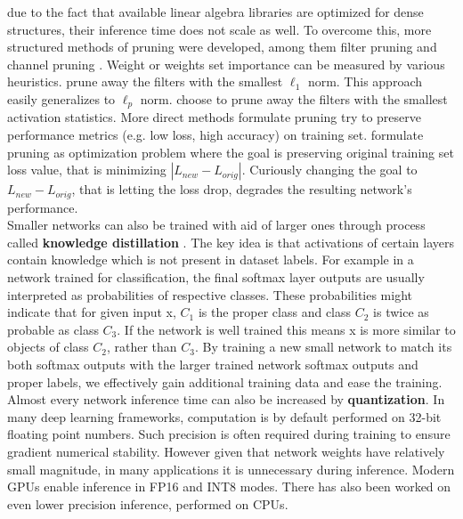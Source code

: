 \documentclass[../Main.tex]{subfiles}
\begin{document}
    due to the fact that available linear algebra libraries are optimized for dense structures,
    their inference time does not scale as well. To overcome this, more structured
    methods of pruning were developed, among them filter pruning \cite{li2016pruning, molchanov2016pruning}
    and channel pruning \cite{he2017channel}. 
    Weight or weights set importance can be measured by various heuristics. 
    \cite{li2016pruning} prune away the filters with the smallest $\ell_1$ norm.
    This approach easily generalizes to $\ell_p$ norm.
    \cite{polyak2015} choose to prune away the filters with
    the smallest activation statistics. More direct methods formulate pruning 
    try to preserve performance metrics (e.g. low loss, high accuracy) on training set. 
    \cite{molchanov2016pruning} formulate pruning as optimization problem where
    the goal is preserving original training set loss value, that is minimizing
    $|L_{new} - L_{orig}|$. Curiously changing the goal to $L_{new} - L_{orig}$,
    that is letting the loss drop, degrades the resulting network's performance.\\
    Smaller networks can also be trained with aid of larger ones through process called
    \textbf{knowledge distillation} \cite{hinton2015distilling}. 
    The key idea is that activations of certain layers
    contain knowledge which is not present in dataset labels. For example in a network  trained for classification, the final softmax layer outputs are usually 
    interpreted as probabilities of respective classes. These probabilities might indicate that for given input x, $C_1$ is the proper class and class $C_2$ is twice as probable 
    as class $C_3$. If the network is well trained this means x is more similar to
    objects of class $C_2$, rather than $C_3$. By training a new small network to match its both
    softmax outputs with the larger trained network softmax outputs and proper labels,
    we effectively gain additional training data and ease the training.
    Almost every network inference time can also be increased by \textbf{quantization}.
    In many deep learning frameworks, computation is by default performed on
    32-bit floating point numbers. Such precision is often required during training to 
    ensure gradient numerical stability. However given that network weights have
    relatively small magnitude, in many applications it is unnecessary during inference.
    Modern GPUs enable inference in FP16 and INT8 modes. There has also been worked 
    on even lower precision inference, performed on CPUs. 
    
        
\biblio %
\end{document}

